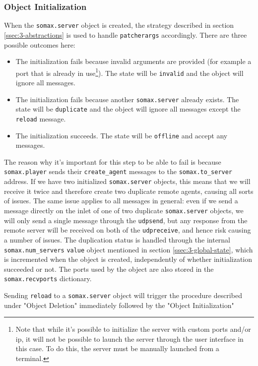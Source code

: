 
\subsubsection{Object Initialization}
When the \texttt{somax.server} object is created, the strategy described in section \ref{ssec:3-abstractions} is used to handle \texttt{patcherargs} accordingly. There are three possible outcomes here:
\begin{itemize}
	\item The initialization fails because invalid arguments are provided (for example a port that is already in use\footnote{Note that while it's possible to initialize the server with custom ports and/or ip, it will not be possible to launch the server through the user interface in this case. To do this, the server must be manually launched from a terminal.}). The state will be \texttt{invalid} and the object will ignore all messages.
	\item The initialization fails because another \texttt{somax.server} already exists. The state will be \texttt{duplicate} and the object will ignore all messages except the \texttt{reload} message.
	\item The initialization succeeds. The state will be \texttt{offline} and accept any messages.
\end{itemize}

\noindent The reason why it's important for this step to be able to fail is because \texttt{somax.player} sends their \texttt{create\_agent} messages to the \texttt{somax.to\_server} address. If we have two initialized \texttt{somax.server} objects, this means that we will receive it twice and therefore create two duplicate remote agents, causing all sorts of issues. The same issue applies to all messages in general: even if we send a message directly on the inlet of one of two duplicate \texttt{somax.server} objects, we will only send a single message through the \texttt{udpsend}, but any response from the remote server will be received on both of the \texttt{udpreceive}, and hence risk causing a number of issues. The duplication status is handled through the internal \texttt{somax.num\_servers} \texttt{value} object mentioned in section \ref{ssec:3-global-state}, which is incremented when the object is created, independently of whether initialization succeeded or not. The ports used by the object are also stored in the \texttt{somax.recvports} dictionary.

Sending \texttt{reload} to a \texttt{somax.server} object will trigger the procedure described under "Object Deletion" immediately followed by the "Object Initialization"

